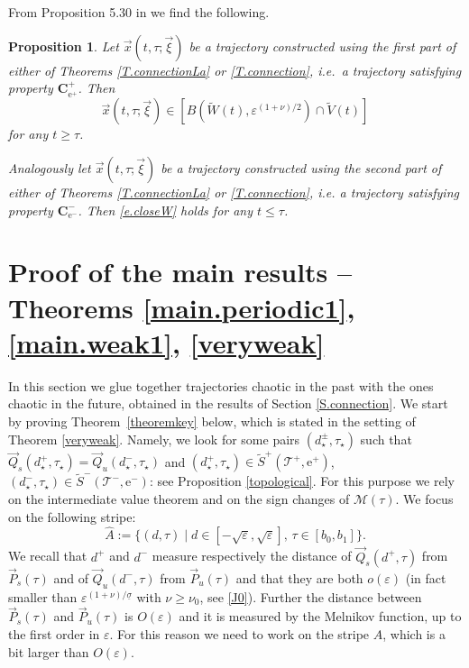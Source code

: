 \documentclass[10pt]{article}
\numberwithin{equation}{section}
\def\ep{\varepsilon}
\def\si{\sigma}
\def\ee{{\mathrm e}}
\def\MM{{\mathcal M}}
\def\TT{{\mathcal T}}
\def\Q{\vec{Q}}
\def\P{\vec{P}}
\def\xxi{\vec{\xi}}
\def\x{\vec{x}}
\newcommand\bs[1]{{\boldsymbol{#1}}}
\def\und{\underline}
\newtheorem{proposition}[theorem]{Proposition}
\theoremstyle{definition}
\theoremstyle{remark}
\begin{document}
From Proposition 5.30   in \cite{CFPrestate} we find the following.
\begin{proposition}\label{closeW}
  Let $\x(t,\tau; \xxi)$ be a trajectory  constructed using the first part of either of Theorems \ref{T.connectionLa} or \ref{T.connection}, i.e.~a trajectory satisfying property $\bs{C_{\ee^+}^+}$. Then
  \begin{equation}\label{e.closeW}
    \x(t,\tau; \xxi) \in [B(\tilde{W}(t), \ep^{(1+\nu)/2}) \cap \tilde{V}(t)]
  \end{equation}
  for any $t \ge \tau$.

  Analogously
  let $\x(t,\tau; \xxi)$ be a trajectory  constructed using the
  second part of either of Theorems \ref{T.connectionLa} or \ref{T.connection}, i.e.
  a trajectory satisfying property $\bs{C_{\ee^-}^-}$. Then
   \eqref{e.closeW} holds for any $t \le \tau$.
\end{proposition}

 \section{Proof of the main results -- Theorems \ref{main.periodic1}, \ref{main.weak1},  \ref{veryweak}}\label{S.mainproof}


In this section
 we glue together   trajectories  chaotic in the past with the ones chaotic in the future, obtained
in the results of Section  \ref{S.connection}.
We  start by proving Theorem~\ref{theoremkey} below, which is stated in the setting of Theorem \ref{veryweak}.
Namely, we look for some pairs $(d^{\pm}_{\star},\tau_{\star})$ such that
$\Q_s(d^+_{\star},\tau_{\star})=\Q_u(d^-_{\star},\tau_{\star})$ and $(d^+_{\star},\tau_{\star})
\in \tilde{S}^+(\TT^+, \ee^+) $,
$(d^-_{\star},\tau_{\star}) \in \tilde{S}^-(\TT^-, \ee^-) $:
see  Proposition \ref{topological}.
For this purpose we rely on the
intermediate value theorem
 and on the sign changes of $\MM(\tau)$.
We focus on the following stripe:
$$\hat{A}:= \{(d,\tau) \mid  d \in  [- \sqrt{\ep}, \sqrt{\ep} ] ,\, \tau \in [b_0,b_1]    \}. $$
 We recall that $d^+$ and $d^-$ measure respectively the distance of $\Q_s(d^+,\tau)$ from $\P_s(\tau)$ and of
$\Q_u(d^-,\tau)$ from $\P_u(\tau)$ and that they are both $o(\ep)$ (in fact smaller than $\ep^{(1+\nu)/\und{\si}}$
with $\nu \ge \nu_0$, see \eqref{J0}).
Further the distance between
$\P_s(\tau)$ and $\P_u(\tau)$ is $O(\ep)$ and it is measured by the Melnikov function, up to the first order in $\ep$.
For this reason we need to work on the stripe  $\hat{A}$, which is  a bit larger than $O(\ep)$.
\end{document}
